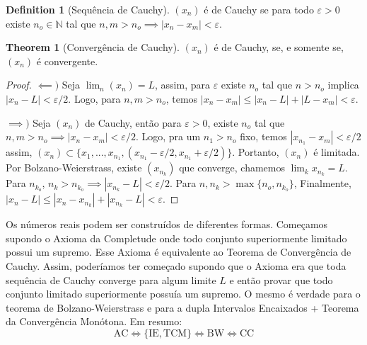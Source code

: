 \documentclass[10pt]{article}
\theoremstyle{definition}
\newtheorem{definition}{Definition}[section]
\newtheorem{theorem}{Theorem}
\begin{document}
\begin{definition}[Sequência de Cauchy]
	$(x_n)$ é de Cauchy se para todo $\varepsilon >0$ existe $n_o \in \mathbb N$ tal que
	$n,m > n_o \implies |x_n - x_m|<\varepsilon$.
\end{definition}
\begin{theorem}[Convergência de Cauchy]
	$(x_n)$ é de Cauchy, se, e somente se, $(x_n)$ é convergente.
\end{theorem}
\begin{proof}
	$\impliedby)$ Seja $\lim_n (x_n) = L$, assim, para $\varepsilon$ existe $n_o$ tal que $n> n_o$ implica
	$|x_n - L| < \varepsilon/2$. Logo, para $n,m > n_o$, temos $|x_n - x_m| \leq |x_n - L| + |L - x_m| < \varepsilon$.

	$\implies)$ Seja $(x_n)$ de Cauchy, então para $\varepsilon > 0$, existe $n_o$ tal que
	$n,m > n_o \implies |x_n - x_m| < \varepsilon/2$. Logo, pra um $n_1>n_o$ fixo, temos $|x_{n_1} - x_m| < \varepsilon/2$
	assim, $(x_n) \subset \{x_1,...,x_{n_1}, (x_{n_1}-\varepsilon/2,x_{n_1}+\varepsilon/2)\}$. Portanto, $(x_n)$ é limitada.
	Por Bolzano-Weierstrass, existe $(x_{n_k})$ que converge, chamemos $\lim_k x_{n_k} = L$.
	Para $n_{k_o}$, $n_k > n_{k_o} \implies |x_{n_k} - L| < \varepsilon/2$.
	Para $n,n_k >\max \{n_o, n_{k_o}\}$,
	Finalmente,$|x_n - L| \leq |x_n - x_{n_k}| + |x_{n_k} - L| < \varepsilon$.
\end{proof}

Os números reais podem ser construídos de diferentes formas. Começamos supondo o Axioma da Completude
onde todo conjunto superiormente limitado possui um supremo. Esse Axioma é equivalente ao Teorema de 
Convergência de Cauchy. Assim, poderíamos ter começado supondo que o Axioma era que toda sequência de Cauchy converge
para algum limite $L$ e então provar que todo conjunto limitado superiormente possuía um supremo.
O mesmo é verdade para o teorema de Bolzano-Weierstrass e para a dupla Intervalos Encaixados + Teorema da
Convergência Monótona. Em resumo:
\begin{equation*}
	\mathrm{AC} \iff \{\mathrm {IE, TCM}\} \iff \mathrm{BW} \iff \mathrm{CC}
\end{equation*}


  
  
\end{document}
